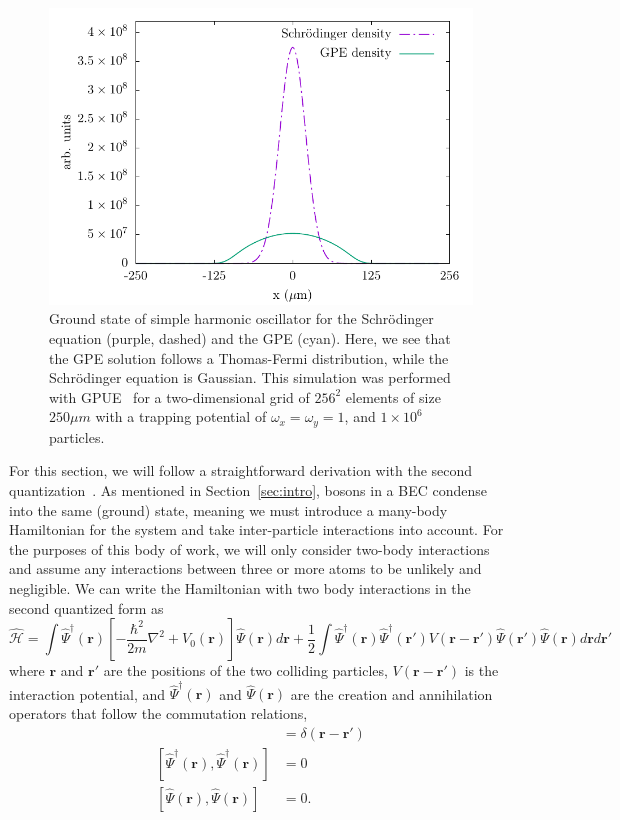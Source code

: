 \begin{figure}
\center \includegraphics[width = \textwidth]{data/qs/SHO/SHO.pdf}

\caption{Ground state of simple harmonic oscillator for the Schr\"odinger equation (purple, dashed) and the GPE (cyan).
Here, we see that the GPE solution follows a Thomas-Fermi distribution, while the Schr\"odinger equation is Gaussian.
This simulation was performed with GPUE~\cite{schloss2018} for a two-dimensional grid of $256^2$ elements of size $250 \mu m$ with a trapping potential of $\omega_x = \omega_y = 1$, and $1\times 10^6$ particles.}
\label{fig:TF}
\end{figure}


For this section, we will follow a straightforward derivation with the second quantization~\cite{aversa2008}.
As mentioned in Section~\ref{sec:intro}, bosons in a BEC condense into the same (ground) state, meaning we must introduce a many-body Hamiltonian for the system and take inter-particle interactions into account.
For the purposes of this body of work, we will only consider two-body interactions and assume any interactions between three or more atoms to be unlikely and negligible.
We can write the Hamiltonian with two body interactions in the second quantized form as
\begin{equation}
    \mathcal{\hat H} = \int \hat \Psi^\dagger(\mathbf{r})\left[-\frac{\hbar^2}{2m}\nabla^2 + V_0(\mathbf{r}) \right]\hat \Psi(\mathbf{r}) d\mathbf{r} + \frac{1}{2} \int  \hat \Psi^\dagger(\mathbf{r}) \hat \Psi^\dagger(\mathbf{r'}) V(\mathbf{r} - \mathbf{r'})\hat \Psi(\mathbf{r'}) \hat \Psi(\mathbf{r}) d\mathbf{r} d\mathbf{r'}
    \label{eqn:2nd}
\end{equation}
where $\mathbf{r}$ and $\mathbf{r'}$ are the positions of the two colliding particles, $V(\mathbf{r}-\mathbf{r'})$ is the interaction potential, and $\hat \Psi^\dagger(\mathbf{r})$ and $\hat \Psi(\mathbf{r})$ are the creation and annihilation operators that follow the commutation relations,
\begin{align}
 [\hat \Psi(\mathbf{r}),\hat \Psi^\dagger(\mathbf{r})] &= \delta(\mathbf{r} - \mathbf{r'}) \\
 [\hat \Psi^\dagger(\mathbf{r}),\hat \Psi^\dagger(\mathbf{r})] &= 0 \\
 [\hat \Psi(\mathbf{r}),\hat \Psi(\mathbf{r})] &= 0.
\end{align}

